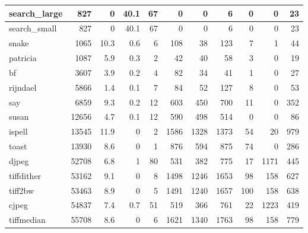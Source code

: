 \begin{tabular}{|l|r|r|r|r|r|r|r|r|r|r|}
\hline
 search\_large    &            827 &      0   &   40.1 &   67 &      0 &          0 &            6 &     0 &     0 &    23 \\
\hline
 search\_small    &            827 &      0   &   40.1 &   67 &      0 &          0 &            6 &     0 &     0 &    23 \\
\hline
 snake           &           1065 &     10.3 &    0.6 &    6 &    108 &         38 &          123 &     7 &     1 &    44 \\
\hline
 patricia        &           1087 &      5.9 &    0.3 &    2 &     42 &         40 &           58 &     3 &     0 &    19 \\
\hline
 bf              &           3607 &      3.9 &    0.2 &    4 &     82 &         34 &           41 &     1 &     0 &    27 \\
\hline
 rijndael        &           5866 &      1.4 &    0.1 &    7 &     84 &         52 &          127 &     8 &     0 &    53 \\
\hline
 say             &           6859 &      9.3 &    0.2 &   12 &    603 &        450 &          700 &    11 &     0 &   352 \\
\hline
 susan           &          12656 &      4.7 &    0.1 &   12 &    590 &        498 &          514 &     0 &     0 &    86 \\
\hline
 ispell          &          13545 &     11.9 &    0   &    2 &   1586 &       1328 &         1373 &    54 &    20 &   979 \\
\hline
 toast           &          13930 &      8.6 &    0   &    1 &    876 &        594 &          875 &    74 &     0 &   286 \\
\hline
 djpeg           &          52708 &      6.8 &    1   &   80 &    531 &        382 &          775 &    17 &  1171 &   445 \\
\hline
 tiffdither      &          53162 &      9.1 &    0   &    8 &   1498 &       1246 &         1653 &    98 &   158 &   627 \\
\hline
 tiff2bw         &          53463 &      8.9 &    0   &    5 &   1491 &       1240 &         1657 &   100 &   158 &   638 \\
\hline
 cjpeg           &          54837 &      7.4 &    0.7 &   51 &    519 &        366 &          761 &    22 &  1223 &   419 \\
\hline
 tiffmedian      &          55708 &      8.6 &    0   &    6 &   1621 &       1340 &         1763 &    98 &   158 &   779 \\
\hline
\end{tabular}

